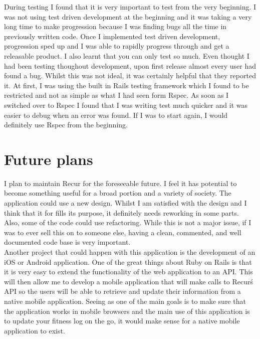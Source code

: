 During testing I found that it is very important to test from the very beginning. I was not using test driven development at the beginning and it was taking a very long time to make progression because I was finding bugs all the time in previously written code. Once I implemented test driven development, progression sped up and I was able to rapidly progress through and get a releasable product. I also learnt that you can only test so much. Even thought I had been testing thoughout development, upon first release almost every user had found a bug. Whilst this was not ideal, it was certainly helpful that they reported it. At first, I was using the built in Rails testing framework which I found to be restricted and not as simple as what I had seen form Rspec. As soon as I switched over to Rspec I found that I was writing test much quicker and it was easier to debug when an error was found. If I was to start again, I would definitely use Rspec from the beginning.

\section{Future plans}
I plan to maintain Recur for the foreseeable future. I feel it has potential to become something useful for a broad portion and a variety of society. The application could use a new design. Whilst I am satisfied with the design and I think that it for fills its purpose, it definitely needs reworking in some parts. Also, some of the code could use refactoring. While this is not a major issue, if I was to ever sell this on to someone else, having a clean, commented, and well documented code base is very important. \\

Another project that could happen with this application is the development of an iOS or Android application. One of the great things about Ruby on Rails is that it is very easy to extend the functionality of the web application to an API. This will then allow me to develop a mobile application that will make calls to Recur\'s API so the users will be able to retrieve and update their information from a native mobile application. Seeing as one of the main goals is to make sure that the application works in mobile browsers and the main use of this application is to update your fitness log on the go, it would make sense for a native mobile application to exist. 